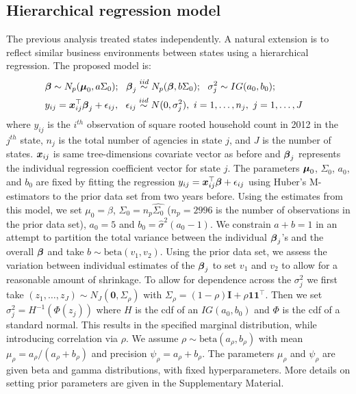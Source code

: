\documentclass[ba]{imsart}
\def\bbeta{\mbox{\boldmath $\beta$}}
\def\bmu{\mbox{\boldmath $\mu$}}
\newcommand{\bx}{\mbox{\boldmath $x$}}
\newcommand{\mb}{\mathbf}
\newcommand{\iid}{\stackrel{iid}{\sim}}
\begin{document}
\subsection{Hierarchical regression model}
\label{hierRegNW}
The previous analysis treated states independently. A natural extension is to  reflect similar business environments between states using a hierarchical regression. The proposed model is:
\begin{align}
\label{eq:hierModel}
&\bbeta\sim N_p(\bmu_0, a\Sigma_0);\ \ 
\bbeta_j\iid N_p(\bbeta, b\Sigma_0); \ \  
\sigma_j^2\sim IG(a_0,b_0);  & \\ 
& y_{ij}=\bx_{ij}^\top\bbeta_j+\epsilon_{ij},\ \ \epsilon_{ij}\iid N(0, \sigma_j^2),\ i=1,\dots, n_j,\ j=1,\dots, J &
\end{align}
where $y_{ij}$ is the $i^{th}$ observation of square rooted household count in 2012 in the $j^{th}$
state, $n_{j}$ is the total number of agencies in state $j$, and $J$ is
the number of states. $\bx_{ij}$ is same tree-dimensions covariate vector as before and $\bbeta_j$ represents the individual regression coefficient vector for state $j$. The parameters $\bmu_0$,
$\Sigma_0$, $a_0$, and $b_0$ are fixed by fitting  the regression $y_{ij}=\bx_{ij}^{\top}\bbeta+\epsilon_{ij}$ using Huber's M-estimators to the prior data set from two years before. Using the estimates from this model, we set $\mu_{0} = \hat\beta$, $\Sigma_{0} = n_{p}\hat{\Sigma_{0}}$ ($n_{p} = 2996$ is the number of observations in the prior data set), $a_{0}=5$ and $b_{0} = \hat\sigma^{2}(a_{0} -1)$. We constrain $a+b=1$
in an attempt to partition the total variance between the individual
$\bbeta_j$'s and the overall $\bbeta$ and take $b\sim
\text{beta}(v_1,v_2)$. Using the prior data set, we assess the
variation between individual estimates of the $\bbeta_j$ to set $v_1$
and $v_2$ to allow for a reasonable amount of shrinkage. To allow for
dependence across the $\sigma_j^2$ we first take
$(z_1,\dots,z_J)\sim N_J(\mathbf{0}, \Sigma_\rho)$ with
$\Sigma_\rho=(1-\rho)\mb{I}+\rho \mb{1}\mb{1}^{\top}$. Then we set
$\sigma^2_j=H^{-1}(\Phi(z_j))$ where $H$ is the cdf of an
$IG(a_0,b_0)$ and $\Phi$ is the cdf of a standard normal. This results in the specified marginal distribution, while
introducing correlation via $\rho$. We assume $\rho\sim
\text{beta}(a_\rho,b_\rho)$ with mean $\mu_\rho=a_\rho/(a_\rho+b_\rho)$ and precision
$\psi_\rho=a_\rho+b_\rho$. The parameters $\mu_\rho$ and
$\psi_{\rho}$  are given beta and gamma distributions, with fixed hyperparameters. More details on setting prior parameters are given in the Supplementary Material. 
\end{document}
